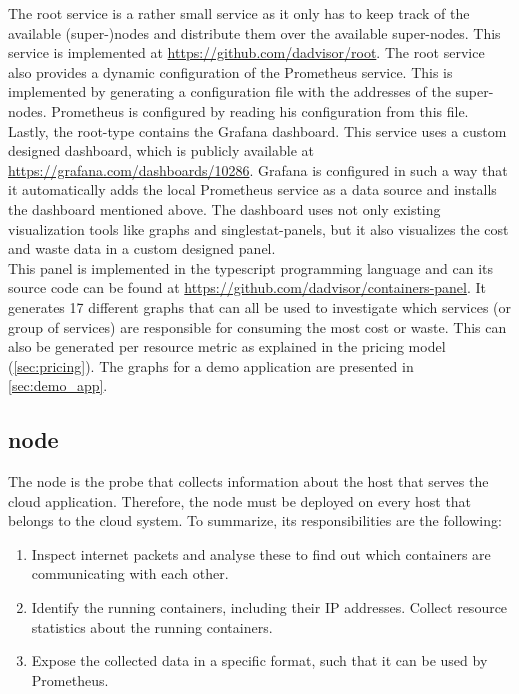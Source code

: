 \noindent
The root service is a rather small service as it only has to keep track of the available (super-)nodes and distribute them over the available super-nodes. This service is implemented at \url{https://github.com/dadvisor/root}. The root service also provides a dynamic configuration of the Prometheus service. This is implemented by generating a configuration file with the addresses of the super-nodes. Prometheus is configured by reading his configuration from this file.\\

\noindent
Lastly, the root-type contains the Grafana dashboard. This service uses a custom designed dashboard, which is publicly available at \url{https://grafana.com/dashboards/10286}. Grafana is configured in such a way that it automatically adds the local Prometheus service as a data source and installs the dashboard mentioned above. The dashboard uses not only existing visualization tools like graphs and singlestat-panels, but it also visualizes the cost and waste data in a custom designed panel.\\

\noindent
This panel is implemented in the typescript programming language and can its source code can be found at \url{https://github.com/dadvisor/containers-panel}. It generates 17 different graphs that can all be used to investigate which services (or group of services) are responsible for consuming the most cost or waste. This can also be generated per resource metric as explained in the pricing model (\autoref{sec:pricing}). The graphs for a demo application are presented in \autoref{sec:demo_app}.

\subsection{node} \label{sec:node_imp}
The node is the probe that collects information about the host that serves the cloud application. Therefore, the node must be deployed on every host that belongs to the cloud system. To summarize, its responsibilities are the following:
\begin{enumerate}
    \item Inspect internet packets and analyse these to find out which containers are communicating with each other.
    \item Identify the running containers, including their IP addresses. Collect resource statistics about the running containers.
    \item Expose the collected data in a specific format, such that it can be used by Prometheus.
\end{enumerate}

